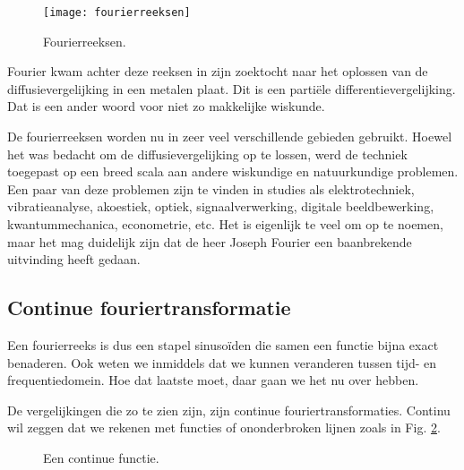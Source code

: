 \documentclass[11pt,fleqn]{book} %
\begin{document}
\begin{figure}[h]
	\centering\texttt{[image: fourierreeksen]}
	\caption{Fourierreeksen.}
	\label{fig:fourierreeksen}
\end{figure}

Fourier kwam achter deze reeksen in zijn zoektocht naar het oplossen van de diffusievergelijking in een metalen plaat. Dit is een partiële differentievergelijking. Dat is een ander woord voor niet zo makkelijke wiskunde.

De fourierreeksen worden nu in zeer veel verschillende gebieden gebruikt. Hoewel het was bedacht om de diffusievergelijking op te lossen, werd de techniek toegepast op een breed scala aan andere wiskundige en natuurkundige problemen. Een paar van deze problemen zijn te vinden in studies als elektrotechniek, vibratieanalyse, akoestiek, optiek, signaalverwerking, digitale beeldbewerking, kwantummechanica, econometrie, etc. Het is eigenlijk te veel om op te noemen, maar het mag duidelijk zijn dat de heer Joseph Fourier een baanbrekende uitvinding heeft gedaan.

\subsection{Continue fouriertransformatie}
Een fourierreeks is dus een stapel sinusoïden die samen een functie bijna exact benaderen. Ook weten we inmiddels dat we kunnen veranderen tussen tijd- en frequentiedomein. Hoe dat laatste moet, daar gaan we het nu over hebben.

De vergelijkingen die zo te zien zijn, zijn continue fouriertransformaties. Continu wil zeggen dat we rekenen met functies of ononderbroken lijnen zoals in Fig. \ref{fig:fx}.

\begin{figure}
\centering
{}
\caption{Een continue functie.}
\label{fig:fx}
\end{figure}
\end{document}
